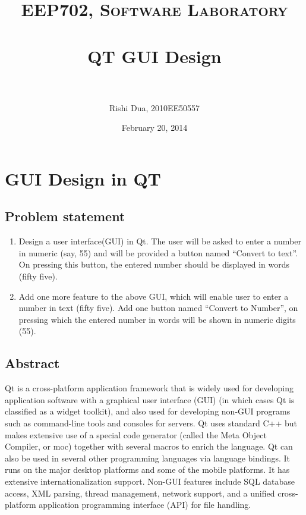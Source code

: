\documentclass[paper=a4, fontsize=11pt]{scrartcl} %
\title{	
\normalfont \normalsize 
\textsc{EEP702, Software Laboratory} \\ [25pt] %
\horrule{0.5pt} \\[0.4cm] %
\huge QT GUI Design\\ %
\horrule{2pt} \\[0.5cm] %
}
\author{Rishi Dua, 2010EE50557} %
\date{\normalsize February 20, 2014} %
\numberwithin{equation}{section} %
\numberwithin{figure}{section} %
\numberwithin{table}{section} %
\begin{document}
\maketitle %


\section{GUI Design in QT}


\subsection{Problem statement}
\begin {enumerate}
\item Design a user interface(GUI) in Qt. The user will be asked to enter a number in numeric
(say, 55) and will be provided a button named “Convert to text”. On pressing this button, the
entered number should be displayed in words (fifty five).

\item Add one more feature to the above GUI, which will enable user to enter a number in text
(fifty five). Add one button named “Convert to Number”, on pressing which the entered
number in words will be shown in numeric digits (55).
\end{enumerate}

\subsection{Abstract}

Qt  is a cross-platform application framework that is widely used for developing application software with a graphical user interface (GUI) (in which cases Qt is classified as a widget toolkit), and also used for developing non-GUI programs such as command-line tools and consoles for servers.
Qt uses standard C++ but makes extensive use of a special code generator (called the Meta Object Compiler, or moc) together with several macros to enrich the language. Qt can also be used in several other programming languages via language bindings. It runs on the major desktop platforms and some of the mobile platforms. It has extensive internationalization support. Non-GUI features include SQL database access, XML parsing, thread management, network support, and a unified cross-platform application programming interface (API) for file handling.\\
\end{document}
